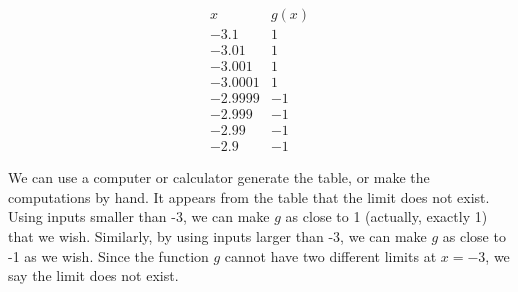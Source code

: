 \begin{enumerate}[(a)]
{\color{blue} 
\begin{multicols}{2}
$$\begin{array}{r|l}
x & g(x) \\
\hline
-3.1 & 1 \\
-3.01 & 1 \\
-3.001 & 1 \\
-3.0001 & 1 \\
-2.9999 & -1 \\
-2.999 & -1 \\
-2.99 & -1 \\
-2.9 & -1
\end{array}$$
\columnbreak %

We can use a computer or calculator generate the table, or make the computations by hand.  It appears from the table that the limit does not exist. Using inputs smaller than -3, we can make $g$ as close to 1 (actually, exactly 1) that we wish.  Similarly, by using inputs larger than -3, we can make $g$ as close to -1 as we wish. Since the function $g$ cannot have two different limits at $x = -3$, we say the limit does not exist.
\end{multicols}
}

\newpage %


\end{enumerate}
